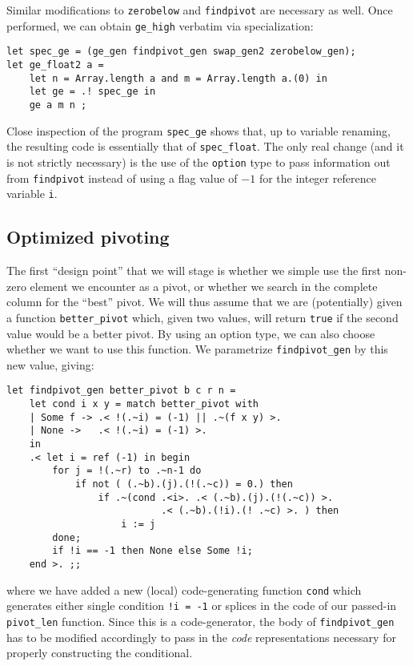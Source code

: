 \documentclass[11pt]{elsart}
\begin{document}
\noindent  Similar modifications to \texttt{zerobelow} and
\texttt{findpivot} are necessary as well.  Once performed, we can
obtain \texttt{ge\_high} verbatim via specialization:
\begin{small}
\begin{verbatim}
let spec_ge = (ge_gen findpivot_gen swap_gen2 zerobelow_gen);
let ge_float2 a = 
    let n = Array.length a and m = Array.length a.(0) in
    let ge = .! spec_ge in
    ge a m n ;
\end{verbatim}
\end{small}
\noindent Close inspection of the program \texttt{spec\_ge} shows that,
up to variable renaming, the resulting code is essentially that 
of \texttt{spec\_float}.
The only real change (and it is not strictly necessary) is the use of
the \texttt{option} type to pass information out from \texttt{findpivot}
instead of using a flag value of $-1$ for the integer reference variable
\texttt{i}.

\subsection{Optimized pivoting}

The first ``design point'' that we will stage is whether we simple use
the first non-zero element we encounter as a pivot, or whether we 
search in the complete column for the ``best'' pivot.  We will thus
assume that we are (potentially) given a function \texttt{better\_pivot}
which, given two values, will return \texttt{true} if the second value
would be a better pivot.  By using an option type, we can also choose
whether we want to use this function.  We parametrize 
\texttt{findpivot\_gen} by this new value, giving:
\begin{small}
\begin{verbatim}
let findpivot_gen better_pivot b c r n =
    let cond i x y = match better_pivot with
    | Some f -> .< !(.~i) = (-1) || .~(f x y) >.
    | None ->   .< !(.~i) = (-1) >.
    in
    .< let i = ref (-1) in begin 
        for j = !(.~r) to .~n-1 do
            if not ( (.~b).(j).(!(.~c)) = 0.) then 
                if .~(cond .<i>. .< (.~b).(j).(!(.~c)) >.
                           .< (.~b).(!i).(! .~c) >. ) then
                    i := j
        done;
        if !i == -1 then None else Some !i;
    end >. ;;
\end{verbatim}
\end{small}
\noindent where we have added a new (local) code-generating
function \texttt{cond} which generates either single condition
\verb+!i = -1+ or splices in the code of our passed-in
\texttt{pivot\_len} function.  Since this is a code-generator,
the body of \texttt{findpivot\_gen} has to be modified accordingly
to pass in the \emph{code} representations necessary for properly
constructing the conditional.
\end{document}
